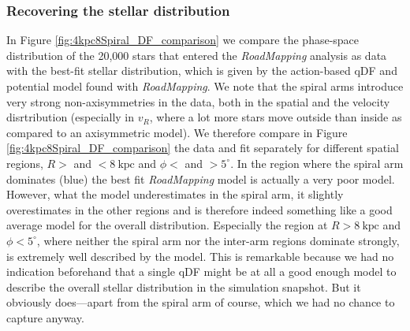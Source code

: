 \documentclass[iop,revtex4,numberedappendix,appendixfloats]{emulateapj}
\newcommand{\RM}{{\sl RoadMapping}}
\begin{document}
\subsubsection{Recovering the stellar distribution} \label{sec:4kpc8Spiral_DF}

In Figure \ref{fig:4kpc8Spiral_DF_comparison} we compare the phase-space distribution of the 20,000 stars that entered the \RM{} analysis as data with the best-fit stellar distribution, which is given by the action-based qDF and potential model found with \RM{}. We note that the spiral arms introduce very strong non-axisymmetries in the data, both in the spatial and the velocity disrtribution (especially in $v_R$, where a lot more stars move outside than inside as compared to an axisymmetric model). We therefore compare in Figure \ref{fig:4kpc8Spiral_DF_comparison} the data and fit separately for different spatial regions, $R>$ and $<8~\text{kpc}$ and $\phi<$ and $>5^\circ$. In the region where the spiral arm dominates (blue) the best fit \RM{} model is actually a very poor model. However, what the model underestimates in the spiral arm, it slightly overestimates in the other regions and is therefore indeed something like a good average model for the overall distribution. Especially the region at $R>8~\text{kpc}$ and $\phi<5^\circ$, where neither the spiral arm nor the inter-arm regions dominate strongly, is extremely well described by the model. This is remarkable because we had no indication beforehand that a single qDF might be at all a good enough model to describe the overall stellar distribution in the simulation snapshot. But it obviously does---apart from the spiral arm of course, which we had no chance to capture anyway.
\end{document}
